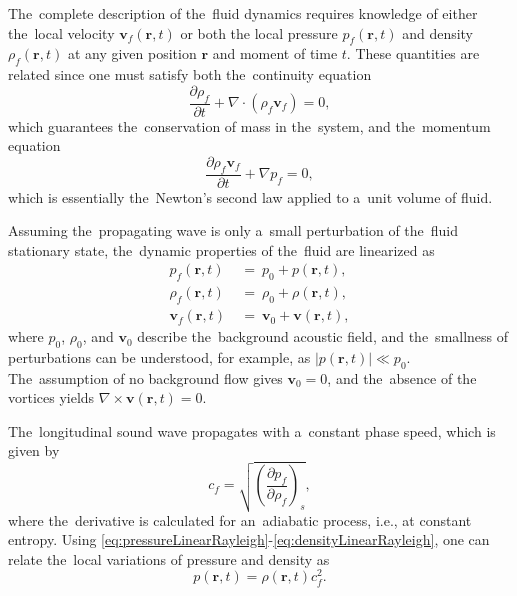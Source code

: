 The~complete description of the~fluid dynamics requires knowledge of either the~local velocity $\mathbf{v}_f(\mathbf{r}, t)$ or both the local pressure $p_f(\mathbf{r}, t)$ and density $\rho_f(\mathbf{r}, t)$ at any given position $\mathbf{r}$ and moment of time $t$.
These quantities are related since one must satisfy both the~continuity equation
\begin{equation}
\label{eq:continuityRayleigh}
\frac{\partial\rho_f}{\partial t} + \nabla\cdot\left(\rho_f\mathbf{v}_f\right) = 0,
\end{equation}
which guarantees the~conservation of mass in the~system, and the~momentum equation
\begin{equation}
\label{eq:secondNLRayleigh}
\frac{\partial \rho_f\mathbf{v}_f}{\partial t} + \nabla p_f = 0,
\end{equation}
which is essentially the~Newton's second law applied to a~unit volume of fluid.

Assuming the~propagating wave is only a~small perturbation of the~fluid stationary state, the~dynamic properties of the~fluid are linearized as
\begin{align}
p_f(\mathbf{r}, t)~&=~p_0 + p(\mathbf{r}, t), \label{eq:pressureLinearRayleigh}\\
\rho_f(\mathbf{r}, t)~&=~\rho_0 + \rho(\mathbf{r}, t), \label{eq:densityLinearRayleigh}\\
\mathbf{v}_f(\mathbf{r}, t)~&=~\mathbf{v}_0 + \mathbf{v}(\mathbf{r}, t), \label{eq:velocityLinearRayleigh}
\end{align}
where $p_0$, $\rho_0$, and $\mathbf{v}_0$ describe the~background acoustic field, and the~smallness of perturbations can be understood, for example, as $|p(\mathbf{r}, t)| \ll p_0$.
The~assumption of no background flow gives $\mathbf{v}_0=0$, and the~absence of the vortices yields $\nabla\times\mathbf{v}(\mathbf{r}, t)=0$.

The~longitudinal sound wave propagates with a~constant phase speed, which is given by
\begin{equation}
c_f = \sqrt{\left(\frac{\partial p_f}{\partial \rho_f}\right)_s},
\end{equation}
where the~derivative is calculated for an~adiabatic process, i.e., at constant entropy.
Using \cref{eq:pressureLinearRayleigh}-\cref{eq:densityLinearRayleigh}, one can relate the~local variations of pressure and density as
\begin{equation}
p(\mathbf{r}, t) = \rho(\mathbf{r}, t)c_f^2.
\end{equation}

